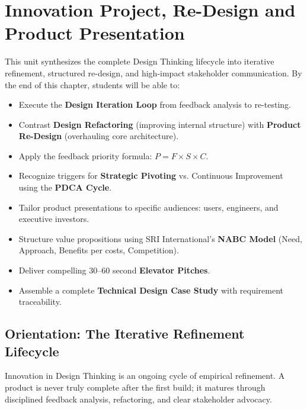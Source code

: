 \chapter{Innovation Project, Re-Design and Product Presentation}
\label{chap:innovation_redesign_presentation}

\begin{tcolorbox}[enhanced, colback=boxnavybg, colframe=brandnavy, boxrule=1.2pt, arc=4pt, title={\Large\bfseries\sffamily Unit 6 Overview \& Learning Objectives}]
\sffamily\normalsize
This unit synthesizes the complete Design Thinking lifecycle into iterative refinement, structured re-design, and high-impact stakeholder communication. By the end of this chapter, students will be able to:
\begin{itemize}[leftmargin=1.2em, itemsep=2pt, topsep=3pt]
    \item Execute the \textbf{Design Iteration Loop} from feedback analysis to re-testing.
    \item Contrast \textbf{Design Refactoring} (improving internal structure) with \textbf{Product Re-Design} (overhauling core architecture).
    \item Apply the feedback priority formula: $P = F \times S \times C$.
    \item Recognize triggers for \textbf{Strategic Pivoting} vs. Continuous Improvement using the \textbf{PDCA Cycle}.
    \item Tailor product presentations to specific audiences: users, engineers, and executive investors.
    \item Structure value propositions using SRI International's \textbf{NABC Model} (Need, Approach, Benefits per costs, Competition).
    \item Deliver compelling 30--60 second \textbf{Elevator Pitches}.
    \item Assemble a complete \textbf{Technical Design Case Study} with requirement traceability.
\end{itemize}
\end{tcolorbox}

\section{Orientation: The Iterative Refinement Lifecycle}

Innovation in Design Thinking is an ongoing cycle of empirical refinement. A product is never truly complete after the first build; it matures through disciplined feedback analysis, refactoring, and clear stakeholder advocacy.

